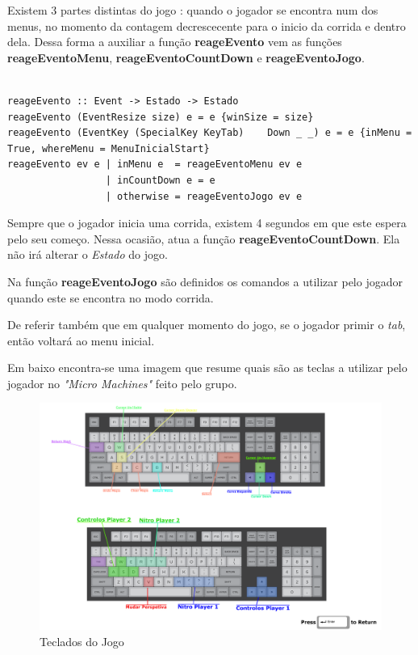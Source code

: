 \documentclass[a4paper]{report} %
\begin{document}
Existem 3 partes distintas do jogo : quando o jogador se encontra num dos menus, no momento da contagem decrescecente para o inicio da corrida e dentro dela. Dessa forma a auxiliar a função \textbf{reageEvento} vem as funções \textbf{reageEventoMenu}, \textbf{reageEventoCountDown} e \textbf{reageEventoJogo}.


\scriptsize

\begin{verbatim}

reageEvento :: Event -> Estado -> Estado
reageEvento (EventResize size) e = e {winSize = size}
reageEvento (EventKey (SpecialKey KeyTab)    Down _ _) e = e {inMenu = True, whereMenu = MenuInicialStart} 
reageEvento ev e | inMenu e  = reageEventoMenu ev e
                 | inCountDown e = e
                 | otherwise = reageEventoJogo ev e

\end{verbatim}

\normalsize


Sempre que o jogador inicia uma corrida, existem 4 segundos em que este espera pelo seu começo. Nessa ocasião, atua a função \textbf{reageEventoCountDown}. Ela não irá alterar o \emph{Estado} do jogo. 

Na função \textbf{reageEventoJogo} são definidos os comandos a utilizar pelo jogador quando este se encontra no modo corrida.

De referir também que em qualquer momento do jogo, se o jogador primir o \textit{tab}, então voltará ao menu inicial.

Em baixo encontra-se uma imagem que resume quais são as teclas a utilizar pelo jogador no \textit{"Micro Machines"} feito pelo grupo.

\begin{figure}[h!]
    
    \centering
    \includegraphics[scale=0.15]{Imagens/teclado.png}
    \caption{Teclados do Jogo}

\end{figure}
\end{document}
